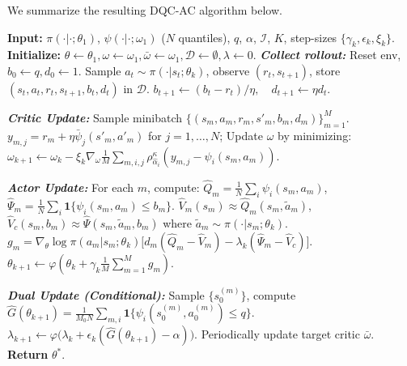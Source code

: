 We summarize the resulting DQC-AC algorithm below.

\begin{algorithm}[ht]
\small %
\caption{Distributional Quantile-Constrained Actor-Critic (DQC-AC)}
\label{alg:dqcac}
\begin{algorithmic}[1]
\STATE \textbf{Input:} $\pi(\cdot|\cdot;\theta_1)$, $\psi(\cdot|\cdot;\omega_1)$ ($N$ quantiles), $q$, $\alpha$, $\mathcal{I}$, $K$, step-sizes $\{\gamma_k,\epsilon_k,\xi_k\}$.
\STATE \textbf{Initialize:} $\theta\gets \theta_1, \omega\gets \omega_1, \bar{\omega}\gets \omega_1, \mathcal{D}\gets \emptyset, \lambda\gets 0$.
    \STATE \textit{\textbf{Collect rollout:}} Reset env, $b_0\gets q, d_0\gets 1$.
        \STATE Sample $a_t\sim \pi(\cdot|s_t;\theta_k)$, observe $(r_t,s_{t+1})$, store $(s_t,a_t,r_t,s_{t+1},b_t,d_t)$ in $\mathcal{D}$.
        \STATE $b_{t+1} \gets (b_t-r_t)/\eta, \quad d_{t+1} \gets \eta d_t$.
    \ENDFOR

    \STATE \textit{\textbf{Critic Update:}} Sample minibatch $\{(s_m,a_m,r_m,s'_m,b_m,d_m)\}_{m=1}^{M}$.
    \STATE $y_{m,j}=r_m+\eta \bar{\psi}_j(s'_m,a'_m)$ for $j=1,\dots,N$; Update $\omega$ by minimizing:
    \STATE $\omega_{k+1} \gets \omega_k-\xi_k\nabla_{\omega} \frac{1}{M}\sum_{m, i, j} \rho_{\hat{\alpha}_i}^{\kappa}(y_{m,j}-\psi_i(s_m,a_m))$.

    \STATE \textit{\textbf{Actor Update:}} For each $m$, compute:
    \STATE $\widehat{Q}_m = \frac{1}{N}\sum_i\psi_i(s_m,a_m)$, $\widehat{\Psi}_m = \frac{1}{N}\sum_i\mathbf{1}\{\psi_i(s_m,a_m)\le b_m\}$.
    \STATE $\widehat{V}_m(s_m) \approx \widehat{Q}_m(s_m,\tilde{a}_m)$, $\widehat{V}_c(s_m,b_m) \approx \widehat{\Psi}(s_m,\tilde{a}_m,b_m)$ where $\tilde{a}_m \sim \pi(\cdot|s_m;\theta_k)$.
    \STATE $g_m = \nabla_{\theta}\log\pi(a_m|s_m;\theta_k) \bigl[ d_m(\widehat{Q}_m-\widehat{V}_m) - \lambda_k(\widehat{\Psi}_m-\widehat{V}_c) \bigr]$.
    \STATE $\theta_{k+1} \gets \varphi( \theta_k+\gamma_k\frac{1}{M}\sum_{m=1}^{M}g_m )$.

    \STATE \textit{\textbf{Dual Update (Conditional):}} 
        \STATE Sample $\{s_0^{(m)}\}$, compute $\widehat{G}(\theta_{k+1}) = \frac{1}{M_0 N}\sum_{m,i} \mathbf{1}\{\psi_i(s_0^{(m)},a_0^{(m)})\le q\}$.
        \STATE $\lambda_{k+1} \gets \varphi\bigl( \lambda_k+\epsilon_k(\widehat{G}(\theta_{k+1})-\alpha) \bigr)$.
    \ENDIF
    \STATE Periodically update target critic $\bar{\omega}$.
\ENDFOR
\STATE \textbf{Return} $\theta^*$.
\end{algorithmic}
\end{algorithm}

